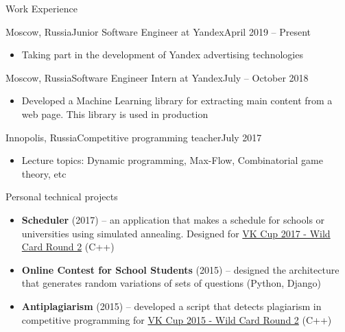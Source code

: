 \documentclass[]{mcdowellcv}
\begin{document}
        \begin{cvsection}{Work Experience}
            \begin{cvsubsection}{Moscow, Russia}{Junior Software Engineer at Yandex}{April 2019 -- Present}
                \vskip 0.3cm
                \begin{itemize}
                    \item Taking part in the development of Yandex advertising technologies
                \end{itemize}
            \end{cvsubsection}
            \begin{cvsubsection}{Moscow, Russia}{Software Engineer Intern at Yandex}{July -- October 2018}
                \vskip 0.3cm
                \begin{itemize}
                    \item Developed a Machine Learning library for extracting main content from a web page. This library is used in production
                \end{itemize}
            \end{cvsubsection}
            \begin{cvsubsection}{Innopolis, Russia}{Competitive programming teacher}{July 2017}
                \vskip 0.3cm
                \begin{itemize}
                    \item Lecture topics: Dynamic programming, Max-Flow, Combinatorial game theory, etc
                \end{itemize}
            \end{cvsubsection}
        \end{cvsection}

	\begin{cvsection}{Personal technical projects}
            \vskip 0.1cm
            \begin{cvsubsection}{}{}{}
                    \begin{itemize}
                        \item \textbf{Scheduler} (2017) -- an application that makes a schedule for schools or universities using simulated annealing. Designed for \href{https://codeforces.com/contest/775/problem/A}{VK Cup 2017 - Wild Card Round 2} (C++)
                            \item \textbf{Online Contest for School Students} (2015) -- designed the architecture that generates random variations of sets of questions (Python, Django)
                            \item \textbf{Antiplagiarism} (2015) -- developed a script that detects plagiarism in competitive programming for \href{https://codeforces.com/contest/537/problem/A}{VK Cup 2015 - Wild Card Round 2} (C++)
                    \end{itemize}
            \end{cvsubsection}
	\end{cvsection}
\end{document}
